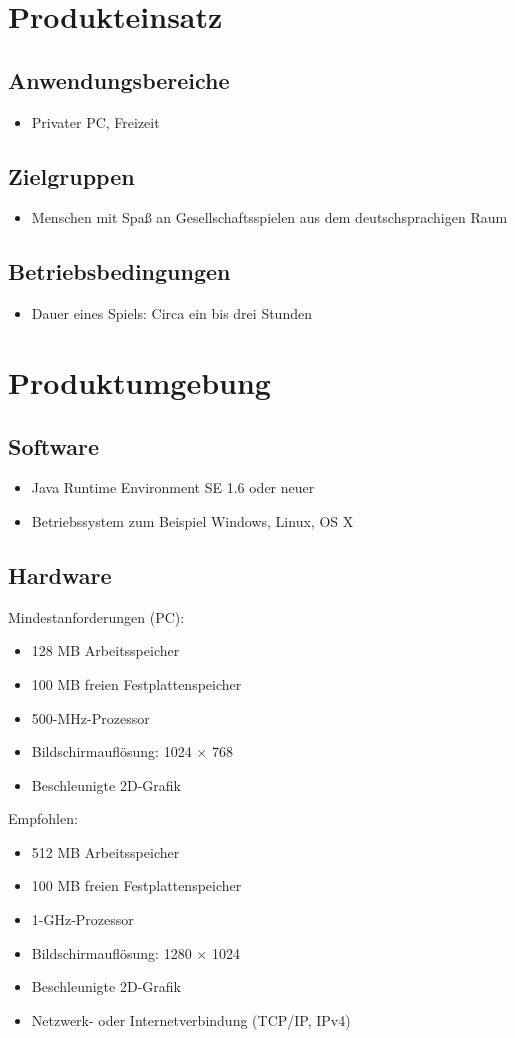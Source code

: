 \documentclass[a4paper,10pt]{article}
\begin{document}
\section{Produkteinsatz}
\subsection{Anwendungsbereiche}
\begin{itemize}
\item Privater PC, Freizeit
\end{itemize}
\subsection{Zielgruppen}
\begin{itemize}
\item Menschen mit Spaß an Gesellschaftsspielen aus dem deutschsprachigen Raum
\end{itemize}
\subsection{Betriebsbedingungen}
\begin{itemize}
\item Dauer eines Spiels: Circa ein bis drei Stunden
\end{itemize}
\section{Produktumgebung}
\subsection{Software}
\begin{itemize}
\item Java Runtime Environment SE 1.6 oder neuer
\item Betriebssystem zum Beispiel Windows, Linux, OS X
\end{itemize}
\subsection{Hardware}
Mindestanforderungen (PC): 
\begin{itemize}
\item 128 MB Arbeitsspeicher
\item 100 MB freien Festplattenspeicher
\item 500-MHz-Prozessor
\item Bildschirmauflösung: 1024 $\times$ 768
\item Beschleunigte 2D-Grafik
\end{itemize}
Empfohlen:
\begin{itemize}
\item 512 MB Arbeitsspeicher
\item 100 MB freien Festplattenspeicher
\item 1-GHz-Prozessor
\item Bildschirmauflösung: 1280 $\times$ 1024
\item Beschleunigte 2D-Grafik
\item Netzwerk- oder Internetverbindung (TCP/IP, IPv4)
\end{itemize}
\end{document}
